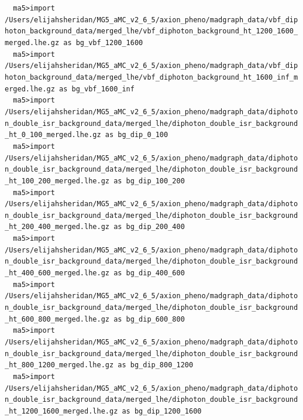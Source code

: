 \documentclass[a4paper, 10pt]{article}
\begin{document}
\texttt{ }\texttt{ }\texttt{ma5>import /\-Users/\-elijahsheridan/\-MG5\_aMC\_v2\_6\_5/\-axion\_pheno/\-madgraph\_data/\-vbf\_diphoton\_background\_data/\-merged\_lhe/\-vbf\_diphoton\_background\_ht\_1200\_1600\_merged.lhe.gz as bg\_vbf\_1200\_1600\\
}
\texttt{ }\texttt{ }\texttt{ma5>import /\-Users/\-elijahsheridan/\-MG5\_aMC\_v2\_6\_5/\-axion\_pheno/\-madgraph\_data/\-vbf\_diphoton\_background\_data/\-merged\_lhe/\-vbf\_diphoton\_background\_ht\_1600\_inf\_merged.lhe.gz as bg\_vbf\_1600\_inf\\
}
\texttt{ }\texttt{ }\texttt{ma5>import /\-Users/\-elijahsheridan/\-MG5\_aMC\_v2\_6\_5/\-axion\_pheno/\-madgraph\_data/\-diphoton\_double\_isr\_background\_data/\-merged\_lhe/\-diphoton\_double\_isr\_background\_ht\_0\_100\_merged.lhe.gz as bg\_dip\_0\_100\\
}
\texttt{ }\texttt{ }\texttt{ma5>import /\-Users/\-elijahsheridan/\-MG5\_aMC\_v2\_6\_5/\-axion\_pheno/\-madgraph\_data/\-diphoton\_double\_isr\_background\_data/\-merged\_lhe/\-diphoton\_double\_isr\_background\_ht\_100\_200\_merged.lhe.gz as bg\_dip\_100\_200\\
}
\texttt{ }\texttt{ }\texttt{ma5>import /\-Users/\-elijahsheridan/\-MG5\_aMC\_v2\_6\_5/\-axion\_pheno/\-madgraph\_data/\-diphoton\_double\_isr\_background\_data/\-merged\_lhe/\-diphoton\_double\_isr\_background\_ht\_200\_400\_merged.lhe.gz as bg\_dip\_200\_400\\
}
\texttt{ }\texttt{ }\texttt{ma5>import /\-Users/\-elijahsheridan/\-MG5\_aMC\_v2\_6\_5/\-axion\_pheno/\-madgraph\_data/\-diphoton\_double\_isr\_background\_data/\-merged\_lhe/\-diphoton\_double\_isr\_background\_ht\_400\_600\_merged.lhe.gz as bg\_dip\_400\_600\\
}
\texttt{ }\texttt{ }\texttt{ma5>import /\-Users/\-elijahsheridan/\-MG5\_aMC\_v2\_6\_5/\-axion\_pheno/\-madgraph\_data/\-diphoton\_double\_isr\_background\_data/\-merged\_lhe/\-diphoton\_double\_isr\_background\_ht\_600\_800\_merged.lhe.gz as bg\_dip\_600\_800\\
}
\texttt{ }\texttt{ }\texttt{ma5>import /\-Users/\-elijahsheridan/\-MG5\_aMC\_v2\_6\_5/\-axion\_pheno/\-madgraph\_data/\-diphoton\_double\_isr\_background\_data/\-merged\_lhe/\-diphoton\_double\_isr\_background\_ht\_800\_1200\_merged.lhe.gz as bg\_dip\_800\_1200\\
}
\texttt{ }\texttt{ }\texttt{ma5>import /\-Users/\-elijahsheridan/\-MG5\_aMC\_v2\_6\_5/\-axion\_pheno/\-madgraph\_data/\-diphoton\_double\_isr\_background\_data/\-merged\_lhe/\-diphoton\_double\_isr\_background\_ht\_1200\_1600\_merged.lhe.gz as bg\_dip\_1200\_1600\\
}
\end{document}
